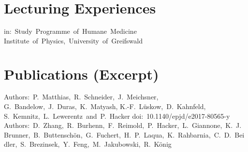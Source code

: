 \documentclass[11pt,a4paper]{moderncv}
\begin{document}
\section{Lecturing Experiences}
%
{in:~Study~Programme~of~Humane~Medicine\newline}{}%
{Institute~of~Physics,~University~of~Greifswald}{}


\section{Publications (Excerpt)}
%
{Authors:~P.~Matthias,~R.~Schneider,~J.~Meichsner,~%
    G.~Bandelow,~J.~Duras,~K.~Matyash, K.-F.~Lüskow,~D.~Kahnfeld,~%
    S.~Kemnitz,~L.~Lewerentz~and~P.~Hacker}{%
    doi:~10.1140/epjd/e2017-80565-y}{}{}
%
{Authors:~D.~Zhang,~R.~Burhenn,~F.~Reimold,~P.~Hacker,~L.~Giannone,~K.~J.~Brunner,~B.~Buttenschön,~G.~Fuchert,~H.~P.~Laqua,~K.~Rahbarnia,~C.~D.~Beidler,~S.~Brezinsek,~Y.~Feng,~M.~Jakubowski,~R.~König}{}{}{}
\end{document}
